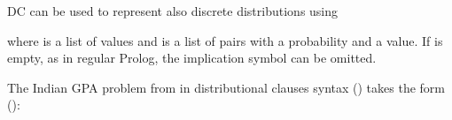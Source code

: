 \documentclass[letterpaper,10pt,english]{sphinxmanual}
\begin{document}
\sphinxAtStartPar
DC can be used to represent also discrete distributions using

\begin{sphinxVerbatim}[commandchars=\\\{\}]
  
  
\end{sphinxVerbatim}

\sphinxAtStartPar
where  is a list of values and  is a list of pairs  with  a probability and  a value.
If  is empty, as in regular Prolog, the implication symbol \sphinxcode{\sphinxupquote{:=}} can be omitted.

\sphinxAtStartPar
The Indian GPA problem from  in distributional clauses syntax
() takes the form ():
\end{document}
